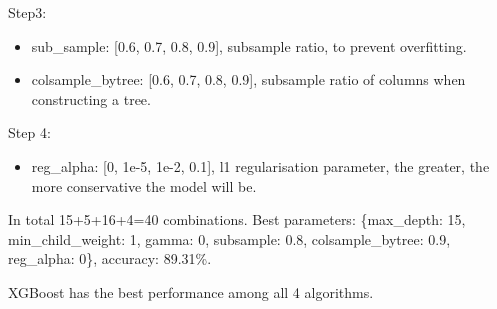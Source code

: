 \documentclass[12pt]{article}
\begin{document}
Step3:
\begin{itemize}
    \item sub\_sample: [0.6, 0.7, 0.8, 0.9], subsample ratio, to prevent overfitting.
    \item colsample\_bytree: [0.6, 0.7, 0.8, 0.9], subsample ratio of columns when constructing a tree.
\end{itemize}

Step 4:
\begin{itemize}
    \item reg\_alpha: [0, 1e-5, 1e-2, 0.1], l1 regularisation parameter, the greater, the more conservative the model will be.
\end{itemize}

In total 15+5+16+4=40 combinations. Best parameters: \{max\_depth: 15, min\_child\_weight: 1, gamma: 0, subsample: 0.8, colsample\_bytree: 0.9, reg\_alpha: 0\}, accuracy: 89.31\%.

XGBoost has the best performance among all 4 algorithms.
\end{document}
